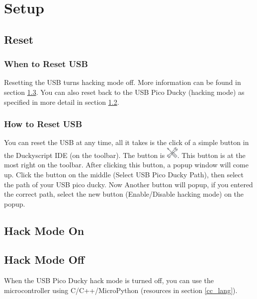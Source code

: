 \documentclass[a4paper,12pt]{article}
\begin{document}
\newpage

\section{Setup}

\subsection{Reset}

\subsubsection{When to Reset USB}

Resetting the USB turns hacking mode off. More information can be found in section \ref{hack_mode_off}. You can also reset back to the USB Pico Ducky (hacking mode) as specified in more detail in section \ref{hack_mode_on}.

\subsubsection{How to Reset USB}\label{how_to_reset}

You can reset the USB at any time, all it takes is the click of a simple button in the Duckyscript IDE (on the toolbar). The button is \includegraphics[width=5.5mm]{pictures/setup.png}. This button is at the most right on the toolbar. After clicking this button, a popup window will come up. Click the button on the middle (Select USB Pico Ducky Path), then select the path of your USB pico ducky. Now Another button will popup, if you entered the correct path, select the new button (Enable/Disable hacking mode) on the popup.

\subsection{Hack Mode On}\label{hack_mode_on}

\subsection{Hack Mode Off}\label{hack_mode_off}

When the USB Pico Ducky hack mode is turned off, you can use the microcontroller using C/C++/MicroPython (resources in section \ref{cc_lang}).
\end{document}

